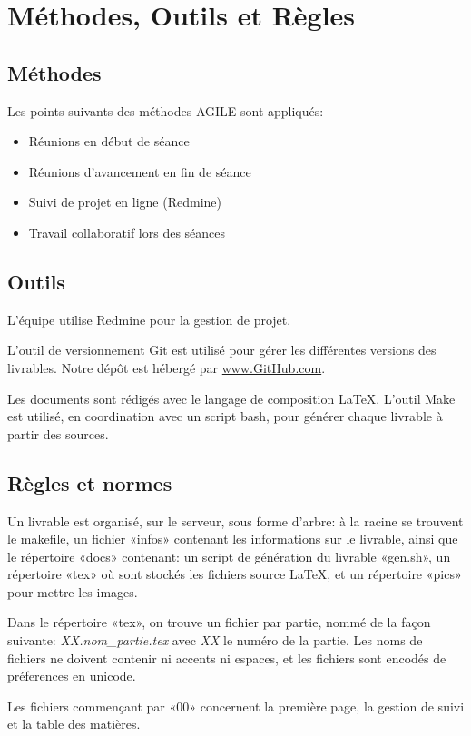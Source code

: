 \section{Méthodes, Outils et Règles}

\subsection{Méthodes}
Les points suivants des méthodes AGILE sont appliqués:
\begin{itemize}
\item Réunions en début de séance
\item Réunions d'avancement en fin de séance
\item Suivi de projet en ligne (Redmine)
\item Travail collaboratif lors des séances
\end{itemize}

\subsection{Outils}
L'équipe utilise Redmine pour la gestion de projet.
\label{outils}

L'outil de versionnement Git est utilisé pour gérer les différentes versions
des livrables. Notre dépôt est hébergé par \url{www.GitHub.com}.

Les documents sont rédigés avec le langage de composition \LaTeX.
L'outil Make est utilisé, en coordination avec un script bash, pour générer
chaque livrable à partir des sources.

\subsection{Règles et normes}

Un livrable est organisé, sur le serveur, sous forme d'arbre: à la racine
se trouvent le makefile, un fichier «infos» contenant les informations sur le
livrable, ainsi que le répertoire «docs» contenant: un script de génération
du livrable «gen.sh», un répertoire «tex» où sont stockés les fichiers source \LaTeX,
et un répertoire «pics» pour mettre les images.

Dans le répertoire «tex», on trouve un fichier par partie, nommé de la façon suivante:
\textsl{XX.nom\_partie.tex} avec \textsl{XX} le numéro de la partie.
Les noms de fichiers ne doivent contenir ni accents ni espaces, et les fichiers
sont encodés de préferences en unicode.

Les fichiers commençant par «00» concernent la première page, la gestion de suivi
et la table des matières.
